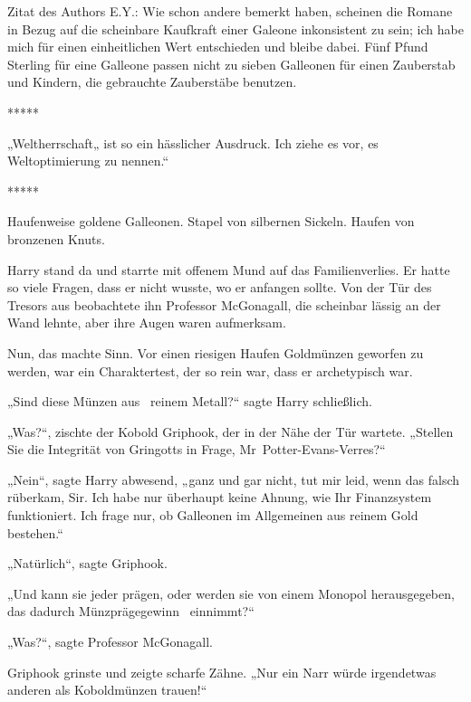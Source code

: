 

\hypertarget{die-hypothese-des-effizienten-marktes}{%

Zitat des Authors E.Y.: Wie schon andere bemerkt haben, scheinen die Romane in Bezug auf die scheinbare Kaufkraft einer Galeone inkonsistent zu sein; ich habe mich für einen einheitlichen Wert entschieden und bleibe dabei. Fünf Pfund Sterling für eine Galleone passen nicht zu sieben Galleonen für einen Zauberstab und Kindern, die gebrauchte Zauberstäbe benutzen. ~

*****

„Weltherrschaft„ ist so ein hässlicher Ausdruck. Ich ziehe es vor, es Weltoptimierung zu nennen.“ ~

*****

Haufenweise goldene Galleonen. Stapel von silbernen Sickeln. Haufen von bronzenen Knuts.

Harry stand da und starrte mit offenem Mund auf das Familienverlies. Er hatte so viele Fragen, dass er nicht wusste, wo er anfangen sollte. Von der Tür des Tresors aus beobachtete ihn Professor McGonagall, die scheinbar lässig an der Wand lehnte, aber ihre Augen waren aufmerksam.

Nun, das machte Sinn. Vor einen riesigen Haufen Goldmünzen geworfen zu werden, war ein Charaktertest, der so rein war, dass er archetypisch war.

„Sind diese Münzen aus ~reinem Metall?“ sagte Harry schließlich.

„Was?“, zischte der Kobold Griphook, der in der Nähe der Tür wartete. „Stellen Sie die Integrität von Gringotts in Frage, Mr~Potter-Evans-Verres?“

„Nein“, sagte Harry abwesend, „ganz und gar nicht, tut mir leid, wenn das falsch rüberkam, Sir. Ich habe nur überhaupt keine Ahnung, wie Ihr Finanzsystem funktioniert. Ich frage nur, ob Galleonen im Allgemeinen aus reinem Gold bestehen.“

„Natürlich“, sagte Griphook.

„Und kann sie jeder prägen, oder werden sie von einem Monopol herausgegeben, das dadurch Münzprägegewinn ~einnimmt?“

„Was?“, sagte Professor McGonagall.

Griphook grinste und zeigte scharfe Zähne. „Nur ein Narr würde irgendetwas anderen als Koboldmünzen trauen!“

}
